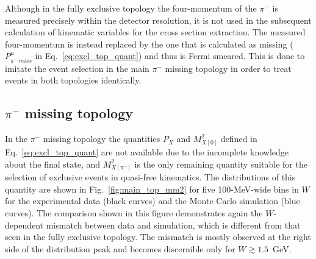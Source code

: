 Although in the fully exclusive topology the four-momentum of the $\pi^{-}$ is measured precisely within the detector resolution, it is not used in the subsequent calculation of kinematic variables for the cross section extraction. The measured four-momentum is instead replaced by the one that is calculated as missing ($P_{\pi^{-}~miss}^{\mu}$ in Eq.~\eqref{eq:excl_top_quant}) and thus is Fermi smeared. This is done to imitate the event selection in the main $\pi^{-}$ missing topology in order to treat events in both topologies identically. 


\subsection{$\pi^{-}$ missing topology}
\label{Sect:excl_cut_pim_miss}

In the $\pi^{-}$ missing topology the quantities $P_{X}$ and $M^{2}_{X[0]}$ defined in Eq.~\eqref{eq:excl_top_quant} are not available due to the incomplete knowledge about the final state, and $M_{X[\pi^{-}]}^{2}$ is the only remaining quantity suitable for the selection of exclusive events in quasi-free kinematics. The distributions of this quantity are shown in Fig.~\ref{fig:main_top_mm2} for five 100-MeV-wide bins in $W$ for the experimental data (black curves) and the Monte Carlo simulation (blue curves). The comparison shown in this figure demonstrates again the $W$-dependent mismatch between data and simulation, which is different from that seen in the fully exclusive topology. The mismatch is mostly observed at the right side of the distribution peak and becomes discernible only for $W\gtrsim 1.5$~GeV.
